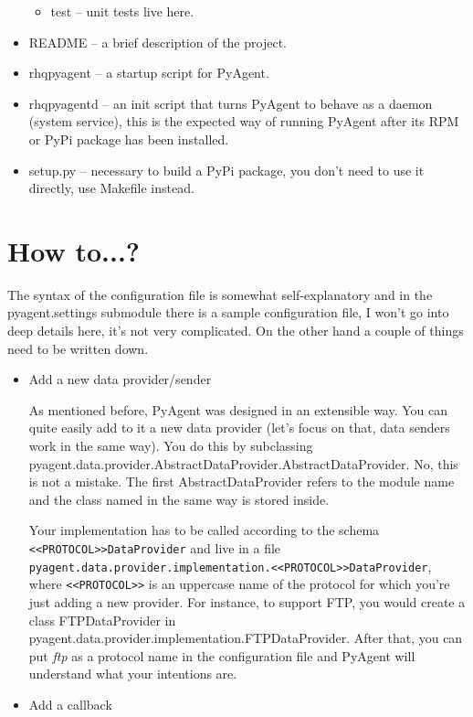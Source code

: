 \documentclass[a4paper,twoside,11pt]{article}
\begin{document}
\begin{itemize}
\begin{itemize}
\begin{itemize}
						\end{itemize}
					\item test -- unit tests live here.
				\end{itemize}
			\item README -- a brief description of the project.
			\item rhqpyagent -- a startup script for PyAgent.
			\item rhqpyagentd -- an init script that turns PyAgent to behave as a daemon (system service), this is the expected way of running PyAgent after its RPM or PyPi package has been installed.
			\item setup.py -- necessary to build a PyPi package, you don't need to use it directly, use Makefile instead.
		\end{itemize}

	\section{How to...?}
		The syntax of the configuration file is somewhat self-explanatory and in the pyagent.settings submodule there is a sample configuration file, I won't go into deep details here, it's not very complicated. On the other hand a couple of things need to be written down.

		\begin{itemize}
			\item Add a new data provider/sender

				As mentioned before, PyAgent was designed in an extensible way. You can quite easily add to it a new data provider (let's focus on that, data senders work in the same way). You do this by subclassing pyagent.data.provider.AbstractDataProvider.AbstractDataProvider. No, this is not a  mistake. The first AbstractDataProvider refers to the module name and the class named in the same way is stored inside.

				Your implementation has to be called according to the schema \texttt{<<PROTOCOL>>DataProvider} and live in a file \texttt{pyagent.data.provider.implementation.<<PROTOCOL>>DataProvider}, where \texttt{<<PROTOCOL>>} is an uppercase name of the protocol for which you're just adding a new provider. For instance, to support FTP, you would create a class FTPDataProvider in pyagent.data.provider.\-implementation.FTPDataProvider. After that, you can put \emph{ftp} as a protocol name in the configuration file and PyAgent will understand what your intentions are.

			\item Add a callback
		\end{itemize}
\end{document}
